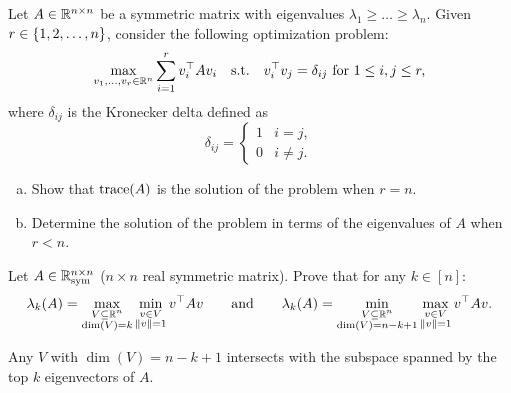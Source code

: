 \begin{myexercise}\label{prob:quadratic_form}
    Let $A \in \mathbb{R}^{n\times n}$ be a symmetric matrix with eigenvalues $\lambda_1\geq  \ldots \geq \lambda_n$. Given $r \in \left\{ 1, 2, \ldots, n \right\}$, consider the following optimization problem:
    \begin{equation*}
        \max_{v_1,\ldots,v_r \in \mathbb{R}^n} \sum_{i=1}^r v_i^\top A v_i \quad \text{s.t.}\quad v_i^\top v_j = \delta_{ij} \text { for } 1 \leq i,j \leq r,
    \end{equation*}
    where $\delta_{ij}$ is the Kronecker delta defined as
    \begin{equation*}
        \delta_{ij} = \begin{cases}
            1 & i = j, \\
            0 & i \neq j.
        \end{cases}
    \end{equation*}
    \begin{enumerate}[(a)]
        \item Show that $\operatorname{trace}(A)$ is the solution of the problem when $r = n$.
        \item Determine the solution of the problem in terms of the eigenvalues of $A$ when $r < n$.
    \end{enumerate}
\end{myexercise}


\begin{myexercise}\label{prob:courant_fischer_formula}
    Let $A \in \mathbb{R}^{n \times n}_{\text{sym}}$ ($n \times n$ real symmetric matrix). Prove that for any $k \in [n]$:
    \begin{equation*}
        \lambda_k(A) = \max_{\substack{V \subseteq \mathbb{R}^n\\ \dim(V) = k}} \min_{\substack{v \in V\\ {\left\lVert{v}\right\rVert} = 1}} v^\top A v
        \qquad\text{and}\qquad
        \lambda_k(A) = \min_{\substack{V \subseteq \mathbb{R}^n\\ \dim(V) = n-k+1}} \max_{\substack{v \in V\\ {\left\lVert{v}\right\rVert} = 1}} v^\top A v.
    \end{equation*}
\end{myexercise}
\begin{hint}
    Any $V$ with $\dim(V) = n-k+1$ intersects with the subspace spanned by the top $k$ eigenvectors of $A$.
\end{hint}

